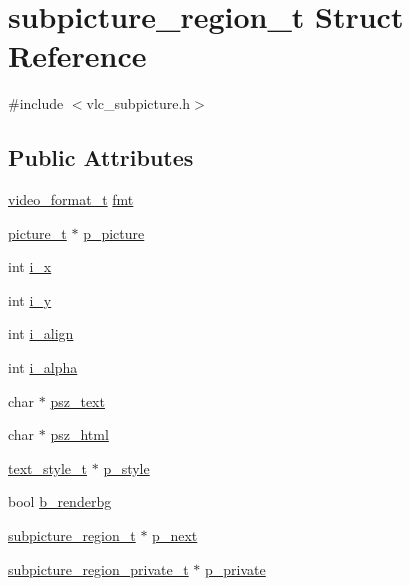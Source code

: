 \hypertarget{structsubpicture__region__t}{}\section{subpicture\+\_\+region\+\_\+t Struct Reference}
\label{structsubpicture__region__t}


{\ttfamily \#include $<$vlc\+\_\+subpicture.\+h$>$}

\subsection*{Public Attributes}
\begin{DoxyCompactItemize}
\item 
\hyperlink{structvideo__format__t}{video\+\_\+format\+\_\+t} \hyperlink{structsubpicture__region__t_a6f825fe2ca5b424933af974e4ed03035}{fmt}
\item 
\hyperlink{structpicture__t}{picture\+\_\+t} $\ast$ \hyperlink{structsubpicture__region__t_a7718ba018aad1f2a5bb2f737fee32369}{p\+\_\+picture}
\item 
int \hyperlink{structsubpicture__region__t_a146642dcb44d19b7423b19232b54c7ba}{i\+\_\+x}
\item 
int \hyperlink{structsubpicture__region__t_a0600117ddc4abe0b9fb32d08c843eaf3}{i\+\_\+y}
\item 
int \hyperlink{structsubpicture__region__t_a06d8795f35bdeb4843dcfc460d96b1a7}{i\+\_\+align}
\item 
int \hyperlink{structsubpicture__region__t_ab162574cede4407425a1959ab6f4dcc0}{i\+\_\+alpha}
\item 
char $\ast$ \hyperlink{structsubpicture__region__t_af1e658d75fc6d2bab50687cdc118f6b3}{psz\+\_\+text}
\item 
char $\ast$ \hyperlink{structsubpicture__region__t_ac75809bfd319e5130ef4228fc0a221c8}{psz\+\_\+html}
\item 
\hyperlink{structtext__style__t}{text\+\_\+style\+\_\+t} $\ast$ \hyperlink{structsubpicture__region__t_a551cb1ab6cfbc446c596d85d55e837e8}{p\+\_\+style}
\item 
bool \hyperlink{structsubpicture__region__t_aec9a691c5feb0113665dc32baad447ac}{b\+\_\+renderbg}
\item 
\hyperlink{structsubpicture__region__t}{subpicture\+\_\+region\+\_\+t} $\ast$ \hyperlink{structsubpicture__region__t_a0466ea80782a86f63c76be2811b7be93}{p\+\_\+next}
\item 
\hyperlink{group__subpicture_ga9be3c246cffef0547fcebbc5d9282ebb}{subpicture\+\_\+region\+\_\+private\+\_\+t} $\ast$ \hyperlink{structsubpicture__region__t_a9244567cb06c6a792f5bace4fa51ecaf}{p\+\_\+private}
\end{DoxyCompactItemize}


